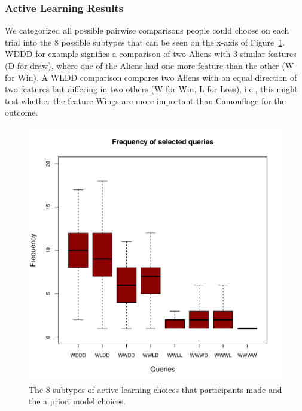 \documentclass[10pt,letterpaper]{article}
\begin{document}
\subsubsection*{Active Learning Results}
We categorized all possible pairwise comparisons people could choose on each trial into the 8 possible subtypes that can be seen on the x-axis of Figure~\ref{shortoverview}. WDDD for example signifies a comparison of two Aliens with 3 similar features (D for draw), where one of the Aliens had one more feature than the other (W for Win). A WLDD comparison compares two Aliens with an equal direction of two features but differing in two others (W for Win, L for Loss), i.e., this might test whether the feature Wings are more important than Camouflage for the outcome.
\begin{figure}[htb!]
	\caption{The 8 subtypes of active learning choices that participants made and the a priori model choices.}
	\label{shortoverview}
	\includegraphics[scale=0.53]{shortoverview.pdf}
\end{figure}
\end{document}
